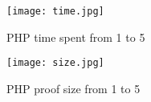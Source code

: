 \documentclass[a4paper,10pt]{book}
\begin{document}
\begin{figure}[h!]
\begin{center}
\texttt{[image: time.jpg]}
\end{center}
\caption{PHP time spent from 1 to 5}
\end{figure}
 
\begin{figure}[h!]
\begin{center}
\texttt{[image: size.jpg]}
\end{center}
\caption{PHP proof size from 1 to 5}
\end{figure}
\end{document}
